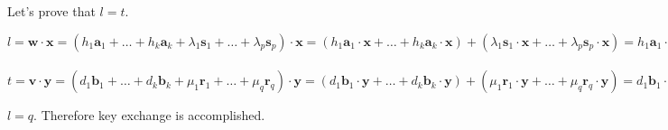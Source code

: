 	Let's prove that $ l = t $. 
	\begin{center}
		$ l = \textbf{w} \cdot \textbf{x} = (h_1 \textbf{a}_1 + \dots + h_k \textbf{a}_k + \lambda_1 \textbf{s}_1 + \dots + \lambda_p \textbf{s}_p) \cdot \textbf{x} = (h_1 \textbf{a}_1 \cdot \textbf{x} + \dots + h_k \textbf{a}_k \cdot \textbf{x}) + (\lambda_1 \textbf{s}_1 \cdot \textbf{x} + \dots + \lambda_p \textbf{s}_p \cdot \textbf{x}) = h_1 \textbf{a}_1 \cdot \textbf{x} + \dots + h_k \textbf{a}_k \cdot \textbf{x} = h_1 d_1 + \dots + h_k d_k $ \\
		\hfill \\
		$ t = \textbf{v} \cdot \textbf{y} = (d_1 \textbf{b}_1 + \dots + d_k \textbf{b}_k + \mu_1 \textbf{r}_1 + \dots + \mu_q \textbf{r}_q) \cdot \textbf{y} = (d_1 \textbf{b}_1 \cdot \textbf{y} + \dots + d_k \textbf{b}_k \cdot \textbf{y}) + (\mu_1 \textbf{r}_1 \cdot \textbf{y} + \dots + \mu_q \textbf{r}_q \cdot \textbf{y}) = d_1 \textbf{b}_1 \cdot \textbf{y} + \dots + d_k \textbf{b}_k \cdot \textbf{y} = d_1 h_1 + \dots + d_k h_k $
	\end{center}
	$l = q$. Therefore key exchange is accomplished.
	 